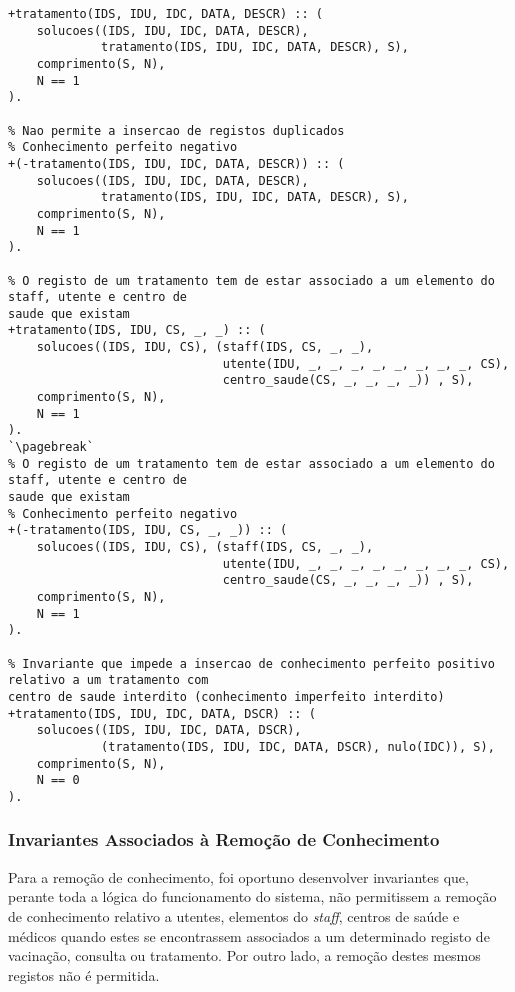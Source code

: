 \begin{lstlisting}[caption={Invariantes de inserção relativos ao predicado \texttt{tratamento}}]
% Nao permite a insercao de registos duplicados
+tratamento(IDS, IDU, IDC, DATA, DESCR) :: (
    solucoes((IDS, IDU, IDC, DATA, DESCR),
             tratamento(IDS, IDU, IDC, DATA, DESCR), S),
    comprimento(S, N),
    N == 1
).

% Nao permite a insercao de registos duplicados
% Conhecimento perfeito negativo
+(-tratamento(IDS, IDU, IDC, DATA, DESCR)) :: (
    solucoes((IDS, IDU, IDC, DATA, DESCR),
             tratamento(IDS, IDU, IDC, DATA, DESCR), S),
    comprimento(S, N),
    N == 1
).

% O registo de um tratamento tem de estar associado a um elemento do staff, utente e centro de 
saude que existam
+tratamento(IDS, IDU, CS, _, _) :: (
    solucoes((IDS, IDU, CS), (staff(IDS, CS, _, _),
                              utente(IDU, _, _, _, _, _, _, _, _, CS),
                              centro_saude(CS, _, _, _, _)) , S),
    comprimento(S, N),
    N == 1
).
`\pagebreak`
% O registo de um tratamento tem de estar associado a um elemento do staff, utente e centro de 
saude que existam
% Conhecimento perfeito negativo
+(-tratamento(IDS, IDU, CS, _, _)) :: (
    solucoes((IDS, IDU, CS), (staff(IDS, CS, _, _),
                              utente(IDU, _, _, _, _, _, _, _, _, CS),
                              centro_saude(CS, _, _, _, _)) , S),
    comprimento(S, N),
    N == 1
).

% Invariante que impede a insercao de conhecimento perfeito positivo relativo a um tratamento com 
centro de saude interdito (conhecimento imperfeito interdito)
+tratamento(IDS, IDU, IDC, DATA, DSCR) :: (
    solucoes((IDS, IDU, IDC, DATA, DSCR),
             (tratamento(IDS, IDU, IDC, DATA, DSCR), nulo(IDC)), S),
    comprimento(S, N),
    N == 0
).

\end{lstlisting}

\subsubsection{Invariantes Associados à Remoção de Conhecimento}
Para a remoção de conhecimento, foi oportuno desenvolver invariantes que, perante toda a lógica 
do funcionamento do sistema,
não permitissem a remoção de conhecimento relativo a utentes, elementos do \textit{staff}, 
centros de saúde e médicos
quando estes se encontrassem associados a um determinado registo de vacinação, consulta ou 
tratamento. Por outro lado, a
remoção destes mesmos registos não é permitida.

